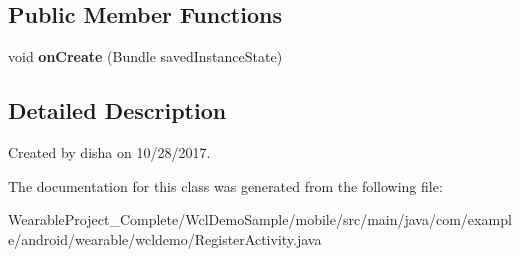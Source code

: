 \subsection*{Public Member Functions}
\begin{DoxyCompactItemize}
\item 
void {\bfseries on\+Create} (Bundle saved\+Instance\+State)\hypertarget{classcom_1_1example_1_1android_1_1wearable_1_1wcldemo_1_1RegisterActivity_a97570cea5b0a43d7c1ae2bc29afba697}{}\label{classcom_1_1example_1_1android_1_1wearable_1_1wcldemo_1_1RegisterActivity_a97570cea5b0a43d7c1ae2bc29afba697}

\end{DoxyCompactItemize}


\subsection{Detailed Description}
Created by disha on 10/28/2017. 

The documentation for this class was generated from the following file\+:\begin{DoxyCompactItemize}
\item 
Wearable\+Project\+\_\+\+Complete/\+Wcl\+Demo\+Sample/mobile/src/main/java/com/example/android/wearable/wcldemo/Register\+Activity.\+java\end{DoxyCompactItemize}
